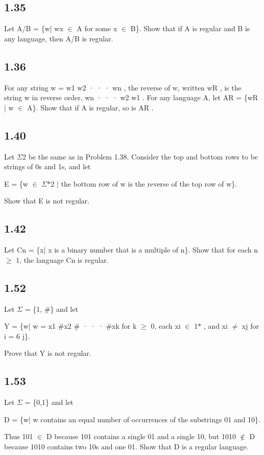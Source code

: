 \subsection*{1.35}

Let A/B = \{w| wx $\in$ A for some x $\in$ B\}. Show that if A is regular and B is any language, then A/B is regular.


\subsection*{1.36}

For any string w = w1 w2 · · · wn , the reverse of w, written wR , is the string w in reverse order, wn · · · w2 w1 . For any language A, let AR = \{wR | w $\in$ A\}. Show that if A is regular, so is AR .


\subsection*{1.40}

Let $\Sigma$2 be the same as in Problem 1.38. Consider the top and bottom rows to be strings of 0s and 1s, and let

E = \{w $\in$ $\Sigma$$\ast$2 | the bottom row of w is the reverse of the top row of w\}.

Show that E is not regular.


\subsection*{1.42}

Let Cn = \{x| x is a binary number that is a multiple of n\}. Show that for each n $\ge$ 1, the language Cn is regular.


\subsection*{1.52}

Let $\Sigma$ = \{1, \#\} and let

Y = \{w| w = x1 \#x2 \# · · · \#xk for k $\ge$ 0, each xi $\in$ 1$\ast$ , and xi $\neq$ xj for i = 6 j\}.

Prove that Y is not regular.


\subsection*{1.53}

Let $\Sigma$ = \{0,1\} and let

D = \{w| w contains an equal number of occurrences of the substrings 01 and 10\}.

Thus 101 $\in$ D because 101 contains a single 01 and a single 10, but 1010 $\notin$ D because 1010 contains two 10s and one 01. Show that D is a regular language.


\clearpage
